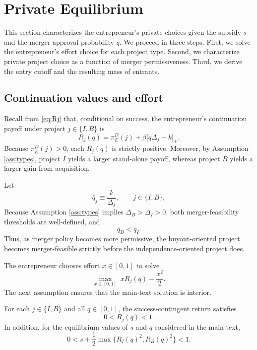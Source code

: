 \section{Private Equilibrium}\label{sec:private}

This section characterizes the entrepreneur's private choices given the subsidy \(s\) and the merger approval probability \(q\).
We proceed in three steps.
First, we solve the entrepreneur's effort choice for each project type.
Second, we characterize private project choice as a function of merger permissiveness.
Third, we derive the entry cutoff and the resulting mass of entrants.

\subsection{Continuation values and effort}

Recall from \eqref{eq:Rj} that, conditional on success, the entrepreneur's continuation payoff under project \(j \in \{I,B\}\) is
\begin{equation}
    R_j(q)
    =
    \pi_E^D(j)
    +
    \beta \bigl[q\Delta_j-k\bigr]_+.
\end{equation}
Because \(\pi_E^D(j)>0\), each \(R_j(q)\) is strictly positive.
Moreover, by Assumption \ref{ass:types}, project \(I\) yields a larger stand-alone payoff,
whereas project \(B\) yields a larger gain from acquisition.

Let
\begin{equation}
    \bar q_j \equiv \frac{k}{\Delta_j},
    \qquad j \in \{I,B\},
\end{equation}
Because Assumption \ref{ass:types} implies \(\Delta_B>\Delta_I>0\), both merger-feasibility thresholds are well-defined, and
\begin{equation}
    \bar q_B < \bar q_I.
\end{equation}
Thus, as merger policy becomes more permissive, the buyout-oriented project becomes merger-feasible strictly before the independence-oriented project does.

The entrepreneur chooses effort \(x \in [0,1]\) to solve
\begin{equation}
    \max_{x \in [0,1]} \;
    xR_j(q)-\frac{x^2}{2}.
\end{equation}
The next assumption ensures that the main-text solution is interior.

\begin{assumption}\label{ass:interior}
For each \(j \in \{I,B\}\) and all \(q \in [0,1]\), the success-contingent return satisfies
\begin{equation}
    0 < R_j(q) < 1.
\end{equation}
In addition, for the equilibrium values of \(s\) and \(q\) considered in the main text,
\begin{equation}
    0
    <
    s + \frac{1}{2}\max\{R_I(q)^2,R_B(q)^2\}
    <
    1.
\end{equation}
\end{assumption}

